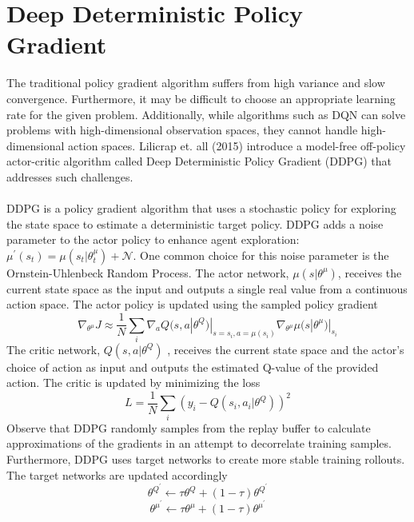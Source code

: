 \documentclass[journal,onecolumn]{IEEEtran}
\begin{document}
\section{Deep Deterministic Policy Gradient}
The traditional policy gradient algorithm suffers from high variance and slow convergence. Furthermore, it may be difficult to choose an appropriate learning rate for the given problem. Additionally, while algorithms such as DQN can solve problems with high-dimensional observation spaces, they cannot handle high-dimensional action spaces. Lilicrap et. all (2015) introduce a model-free off-policy actor-critic algorithm called Deep Deterministic Policy Gradient (DDPG) that addresses such challenges. \\\\
DDPG is a policy gradient algorithm that uses a stochastic policy for exploring the state space to estimate a deterministic target policy. DDPG adds a noise parameter to the actor policy to enhance agent exploration: $\mu^{'}(s_{t}) = \mu(s_{t}|\theta_{t}^{\mu}) + \mathcal{N}$. One common choice for this noise parameter is the Ornstein-Uhlenbeck Random Process. The actor network, $\mu(s|\theta^{μ})$, receives the current state space as the input and outputs a single real value from a continuous action space. The actor policy is updated using the sampled policy gradient
\[
\nabla_{\theta^{\mu}}J \approx \frac{1}{N}\sum_{i}\nabla_{a}Q(s, a|\theta^{Q})|_{s=s_{i}, a=\mu(s_{i})}\nabla_{\theta^{\mu}}\mu(s|\theta^{\mu})|_{s_{i}}
\]
The critic network, $Q(s,a|\theta^{Q})$ , receives the current state space and the actor’s choice of action as input and outputs the estimated Q-value of the provided action. The critic is updated by minimizing the loss 
\[
L = \frac{1}{N}\sum_{i}(y_{i} - Q(s_{i}, a_{i}|\theta^{Q}))^{2}
\]
Observe that DDPG randomly samples from the replay buffer to calculate approximations of the gradients in an attempt to decorrelate training samples. Furthermore, DDPG uses target networks to create more stable training rollouts. The target networks are updated accordingly
\[
\theta^{Q^{'}} \gets \tau\theta^{Q} + (1-\tau)\theta^{Q^{'}}
\]
\[
\theta^{\mu^{'}} \gets \tau\theta^{\mu} + (1-\tau)\theta^{\mu^{'}}
\]
\end{document}
